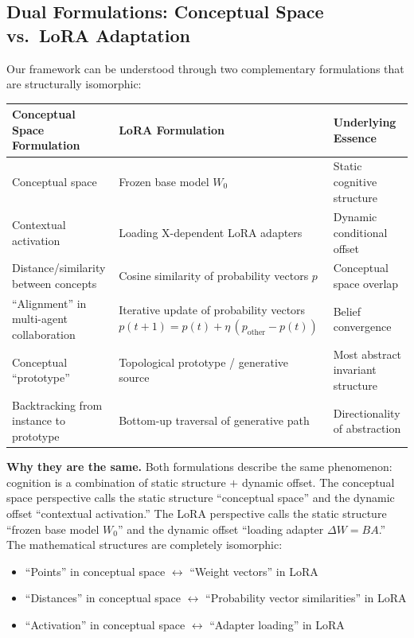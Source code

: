 \documentclass[11pt, a4paper]{article}
\begin{document}
\subsection{Dual Formulations: Conceptual Space vs.\ LoRA Adaptation}
Our framework can be understood through two complementary formulations that are structurally isomorphic:

\begin{table}[h]
\centering
\begin{tabular}{@{}p{}p{}p{}@{}}
\toprule
\textbf{Conceptual Space Formulation} & \textbf{LoRA Formulation} & \textbf{Underlying Essence} \\
\midrule
Conceptual space & Frozen base model $W_0$ & Static cognitive structure \\
Contextual activation & Loading X-dependent LoRA adapters & Dynamic conditional offset \\
Distance/similarity between concepts & Cosine similarity of probability vectors $p$ & Conceptual space overlap \\
``Alignment'' in multi-agent collaboration & Iterative update of probability vectors $p(t+1) = p(t) + \eta\,(p_{\text{other}} - p(t))$ & Belief convergence \\
Conceptual ``prototype'' & Topological prototype / generative source & Most abstract invariant structure \\
Backtracking from instance to prototype & Bottom-up traversal of generative path & Directionality of abstraction \\
\bottomrule
\end{tabular}
\end{table}

\noindent\textbf{Why they are the same.} Both formulations describe the same phenomenon: cognition is a combination of static structure $+$ dynamic offset. The conceptual space perspective calls the static structure ``conceptual space'' and the dynamic offset ``contextual activation.'' The LoRA perspective calls the static structure ``frozen base model $W_0$'' and the dynamic offset ``loading adapter $\Delta W = BA$.'' The mathematical structures are completely isomorphic:
\begin{itemize}
  \item ``Points'' in conceptual space $\leftrightarrow$ ``Weight vectors'' in LoRA
  \item ``Distances'' in conceptual space $\leftrightarrow$ ``Probability vector similarities'' in LoRA
  \item ``Activation'' in conceptual space $\leftrightarrow$ ``Adapter loading'' in LoRA
\end{itemize}
\end{document}
